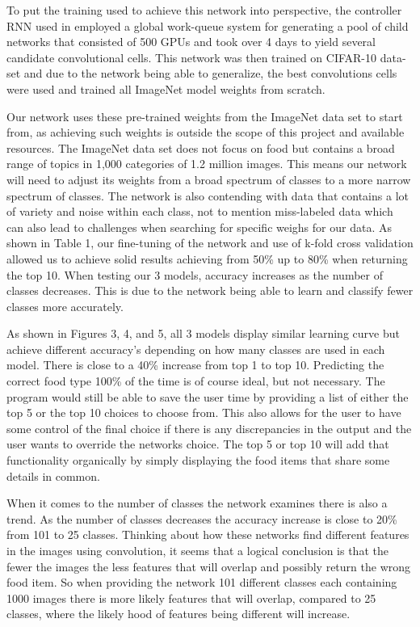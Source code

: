 \documentclass[conference]{IEEEtran}
\begin{document}
To put the training used to achieve this network into perspective, the controller RNN used in \cite{zoph2017learning} employed a global work-queue system for generating a pool of child networks that consisted of 500 GPUs and took over 4 days to yield several candidate convolutional cells. This network was then trained on CIFAR-10 data-set and due to the network being able to generalize, the best convolutions cells were used and trained all ImageNet model weights from scratch. 

Our network uses these pre-trained weights from the ImageNet data set to start from, as achieving such weights is outside the scope of this project and available resources. The ImageNet data set does not focus on food but contains a broad range of topics in 1,000 categories of 1.2 million images. This means our network will need to adjust its weights from a broad spectrum of classes to a more narrow spectrum of classes. The network is also contending with data that contains a lot of variety and noise within each class, not to mention miss-labeled data which can also lead to challenges when searching for specific weighs for our data. As shown in Table 1, our fine-tuning of the network and use of k-fold cross validation allowed us to achieve solid results achieving from 50\% up to 80\% when returning the top 10. When testing our 3 models, accuracy increases as the number of classes decreases. This is due to the network being able to learn and classify fewer classes more accurately.

As shown in Figures 3, 4, and 5, all 3 models display similar learning curve but achieve different accuracy's depending on how many classes are used in each model. There is close to a 40\% increase from top 1 to top 10. Predicting the correct food type 100\% of the time is of course ideal, but not necessary. The program would still be able to save the user time by providing a list of either the top 5 or the top 10 choices to choose from. This also allows for the user to have some control of the final choice if there is any discrepancies in the output and the user wants to override the networks choice. The top 5 or top 10 will add that functionality organically by simply displaying the food items that share some details in common.

When it comes to the number of classes the network examines there is also a trend. As the number of classes decreases the accuracy increase is close to 20\% from 101 to 25 classes. Thinking about how these networks find different features in the images using convolution, it seems that a logical conclusion is that the fewer the images the less features that will overlap and possibly return the wrong food item. So when providing the network 101 different classes each containing 1000 images there is more likely features that will overlap, compared to 25 classes, where the likely hood of features being different will increase.
\end{document}

